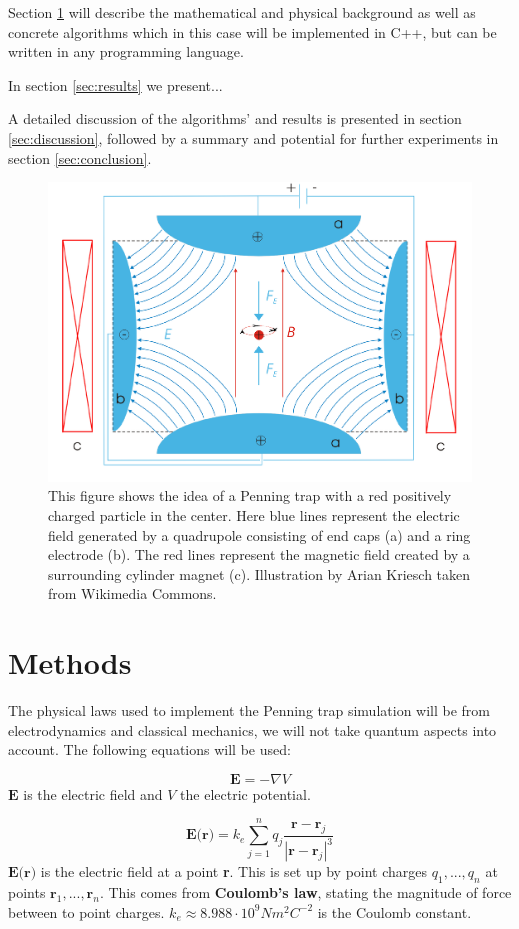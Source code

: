 \documentclass[english,notitlepage,reprint,nofootinbib]{revtex4-1}  %
\begin{document}
Section \ref*{sec:methods} will describe the mathematical and physical background as well as concrete algorithms which in this case will be
implemented in C++, but can be written in any programming language.

In section \ref*{sec:results} we present...

A detailed discussion of the algorithms' and results is presented in section \ref*{sec:discussion}, 
followed by a summary and potential for further experiments in section \ref*{sec:conclusion}.

\begin{figure}[H]
    \centering
    \includegraphics[width=.5\textwidth]{../figures/Penning_trap.pdf}
    \caption{This figure shows the idea of a Penning trap with a red positively charged particle in the center. 
    Here blue lines represent the electric field generated by a quadrupole consisting of end caps (a) and a ring electrode (b). 
    The red lines represent the magnetic field created by a surrounding cylinder magnet (c). 
    Illustration by Arian Kriesch taken from Wikimedia Commons.}
    \label{fig:Penning_trap}
\end{figure}

\section{Methods}\label{sec:methods}
The physical laws used to implement the Penning trap simulation will be from electrodynamics and classical mechanics, we will not take quantum aspects into account.
The following equations will be used:

\begin{equation}\label{eq:el_field}
    \textbf{E} = - \nabla V
\end{equation}
$\textbf{E}$ is the electric field and $V$ the electric potential.

\begin{equation}\label{eq:el_at_r}
    \textbf{E(r)} = k_e \sum_{j=1}^{n} q_j \frac{\textbf{r} - \textbf{r}_j}{|\textbf{r} - \textbf{r}_j|^3}
\end{equation}
$\textbf{E(r)}$ is the electric field at a point \textbf{r}. This is set up by point charges ${q_1,...,q_n}$ at points ${\textbf{r}_1,...,\textbf{r}_n}$. This comes from \textbf{Coulomb's law}, stating the magnitude of force between to point charges. $k_e \approx 8.988 \cdot 10^9 N m^2 C^{-2}$ is the Coulomb constant.  
\end{document}
